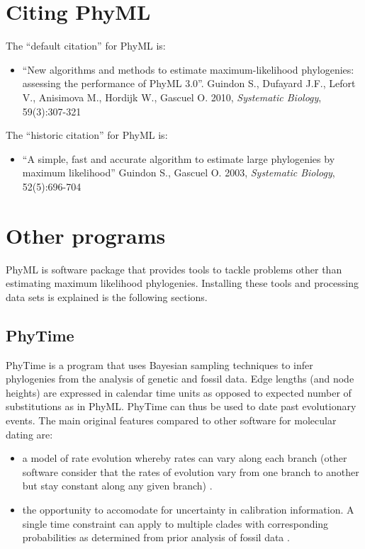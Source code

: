 \documentclass[a4paper,12pt]{article}
\begin{document}
\section{Citing PhyML}
The ``default citation'' for PhyML is:
\begin{itemize}
\item
``New algorithms and methods to estimate maximum-likelihood phylogenies: assessing the performance
of PhyML 3.0''. Guindon S., Dufayard J.F., Lefort V., Anisimova M., Hordijk W., Gascuel O. 2010, {\it Systematic
  Biology}, 59(3):307-321

\end{itemize}
The ``historic citation'' for PhyML is:
\begin{itemize}
\item ``A simple, fast and accurate algorithm to estimate large phylogenies by maximum likelihood''
  Guindon S., Gascuel O. 2003, {\it Systematic Biology}, 52(5):696-704
\end{itemize}



\section{Other programs}

PhyML  is software package  that provides  tools to  tackle problems  other than  estimating maximum
likelihood  phylogenies.  Installing these  tools  and  processing data  sets  is  explained is  the
following sections.

\subsection{PhyTime} PhyTime is  a program that uses Bayesian sampling techniques to
infer phylogenies from the analysis of genetic and fossil data. Edge lengths (and node heights) are
expressed in calendar time units as opposed to expected number of substitutions as in
PhyML. PhyTime can thus be used to date past evolutionary events. The main original features
compared to other software for molecular dating are:
\begin{itemize}
\item a model of rate evolution whereby rates can vary along each branch (other
  software consider that the rates of evolution vary from one branch to another but stay constant
  along any given branch) \cite{guindon13}.
\item the opportunity to accomodate for uncertainty in calibration information. A single time
  constraint can apply to multiple clades with corresponding probabilities as determined from prior
  analysis of fossil data \cite{guindon17}.
\end{itemize}
\end{document}
